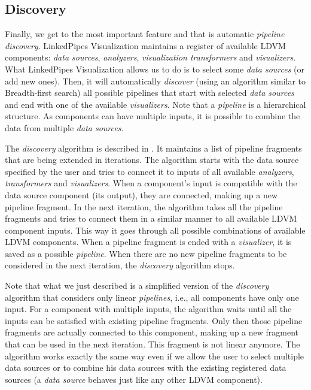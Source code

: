 \subsection{Discovery}

Finally, we get to the most important feature and that is automatic \emph{pipeline discovery}. LinkedPipes Visualization maintains a register of available LDVM components: \emph{data sources}, \emph{analyzers}, \emph{visualization transformers} and \emph{visualizers}. What LinkedPipes Visualization allows us to do is to select some \emph{data sources} (or add new ones). Then, it will automatically \emph{discover} (using an algorithm similar to Breadth-first search) all possible pipelines that start with selected \emph{data sources} and end with one of the available \emph{visualizers}. Note that a \emph{pipeline} is a hierarchical structure. As components can have multiple inputs, it is possible to combine the data from multiple \emph{data sources}.

The \emph{discovery} algorithm is described in \cite{ldvm_use_cases}. It maintains a list of pipeline fragments that are being extended in iterations. The algorithm starts with the data source specified by the user and tries to connect it to inputs of all available \emph{analyzers}, \emph{transformers} and \emph{visualizers}. When a component's input is compatible with the data source component (its output), they are connected, making up a new pipeline fragment. In the next iteration, the algorithm takes all the pipeline fragments and tries to connect them in a similar manner to all available LDVM component inputs. This way it goes through all possible combinations of available LDVM components. When a pipeline fragment is ended with a \emph{visualizer}, it is saved as a possible \emph{pipeline}. When there are no new pipeline fragments to be considered in the next iteration, the \emph{discovery} algorithm stops.

Note that what we just described is a simplified version of the \emph{discovery} algorithm that considers only linear \emph{pipelines}, i.e., all components have only one input. For a component with multiple inputs, the algorithm waits until all the inputs can be satisfied with existing pipeline fragments. Only then those pipeline fragments are actually connected to this component, making up a new fragment that can be used in the next iteration. This fragment is not linear anymore. The algorithm works exactly the same way even if we allow the user to select multiple data sources or to combine his data sources with the existing registered data sources (a \emph{data source} behaves just like any other LDVM component).

